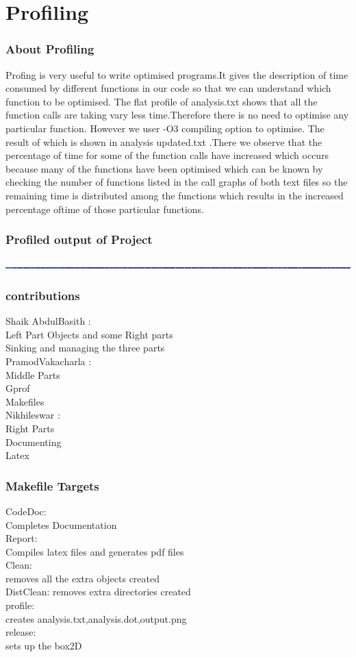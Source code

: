 \documentclass[t,compress,11pt,xcolor=dvipsnames]{beamer}
\begin{document}
\section{Profiling}
\begin{frame}
\frametitle{About Profiling}
Profing is very useful to write optimised programs.It gives the description of time consumed by different functions in our code so that we can understand which function to be optimised.
The flat profile of analysis.txt shows that all the function calls are taking vary less time.Therefore there is no need to optimise any particular function. However we user -O3 compiling option to optimise. The result of which is shown in analysis updated.txt .There we observe that the percentage of time for some of the function calls have increased which occurs because many of the functions have been optimised which can be known by checking the number of functions listed in the call graphs of both text files so the remaining time is distributed among the functions which results in the increased percentage oftime of those particular functions.
\end{frame}
\begin{frame}
\frametitle{Profiled output of Project}
\includegraphics[scale=.022]{output_updated.png}
\end{frame}
\begin{frame}
\frametitle{contributions}
Shaik AbdulBasith\cite{basith} :\\
Left Part Objects and some Right parts\\
Sinking and managing the three parts\\
PramodVakacharla\cite{pramod} :\\
Middle Parts\\
Gprof \\
Makefiles\\
Nikhileswar\cite{nikhileswar} :\\
Right Parts\\
Documenting\\
Latex\\

\end{frame}
\begin{frame}
\frametitle{Makefile Targets}
CodeDoc:\\
Completes Documentation\\
Report:\\
Compiles latex files and generates pdf files\\
Clean:\\
removes all the extra objects created\\
DistClean:
removes extra directories created\\
profile:\\
creates analysis.txt,analysis.dot,output.png\\
release:\\
sets up the box2D\\ 
\end{frame}


\end{document}

